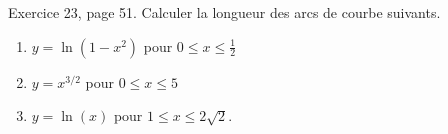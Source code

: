 \begin{exercice}\label{exoInter0012}

Exercice 23, page 51. Calculer la longueur des arcs de courbe suivants.
\begin{enumerate}

\item
$y=\ln(1-x^2)$ pour $0\leq x\leq \frac{ 1 }{2}$
\item
$y=x^{3/2}$ pour $0\leq x\leq 5$
\item
$y=\ln(x)$ pour $1\leq x\leq 2\sqrt{2}$.

\end{enumerate}


\end{exercice}
